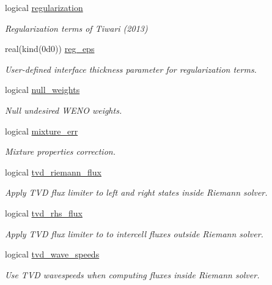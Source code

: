 \begin{DoxyCompactItemize}
logical \hyperlink{namespacem__global__parameters_ac60a57ea5298dde379e24b6b77762101}{regularization}
\begin{DoxyCompactList}\small\item\em Regularization terms of Tiwari (2013) \end{DoxyCompactList}\item 
real(kind(0d0)) \hyperlink{namespacem__global__parameters_a4491f30721e61e94907cac95ff506795}{reg\+\_\+eps}
\begin{DoxyCompactList}\small\item\em User-\/defined interface thickness parameter for regularization terms. \end{DoxyCompactList}\item 
logical \hyperlink{namespacem__global__parameters_a04b52ed3df1c7aac47f18748b3cdddc5}{null\+\_\+weights}
\begin{DoxyCompactList}\small\item\em Null undesired W\+E\+NO weights. \end{DoxyCompactList}\item 
logical \hyperlink{namespacem__global__parameters_a3981c7e6886ba3cde245ce4dcc6ca664}{mixture\+\_\+err}
\begin{DoxyCompactList}\small\item\em Mixture properties correction. \end{DoxyCompactList}\item 
logical \hyperlink{namespacem__global__parameters_af2383f23c599d5936d0559dac1edee9b}{tvd\+\_\+riemann\+\_\+flux}
\begin{DoxyCompactList}\small\item\em Apply T\+VD flux limiter to left and right states inside Riemann solver. \end{DoxyCompactList}\item 
logical \hyperlink{namespacem__global__parameters_a19e98f005eebfd43e924ed2339a1a430}{tvd\+\_\+rhs\+\_\+flux}
\begin{DoxyCompactList}\small\item\em Apply T\+VD flux limiter to to intercell fluxes outside Riemann solver. \end{DoxyCompactList}\item 
logical \hyperlink{namespacem__global__parameters_a4ed04ef4019b9be697d7f13b3d207a17}{tvd\+\_\+wave\+\_\+speeds}
\begin{DoxyCompactList}\small\item\em Use T\+VD wavespeeds when computing fluxes inside Riemann solver. \end{DoxyCompactList}\item 

\end{DoxyCompactItemize}
